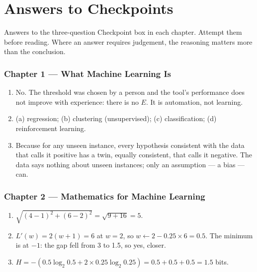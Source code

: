 \chapter{Answers to Checkpoints}\label{app:answers}
\normalfigures

Answers to the three-question Checkpoint box in each chapter. Attempt them before
reading. Where an answer requires judgement, the reasoning matters more than the
conclusion.

\newcommand{\ansch}[1]{\subsection*{\color{primary}Chapter #1}}
\newenvironment{ans}{\begin{enumerate}[leftmargin=*, itemsep=4pt, topsep=3pt,
  label=\textbf{\arabic*.}]}{\end{enumerate}}

\ansch{1 --- What Machine Learning Is}
\begin{ans}
  \item No. The threshold was chosen by a person and the tool's performance does not
        improve with experience: there is no $E$. It is automation, not learning.
  \item (a) regression; (b) clustering (unsupervised); (c) classification;
        (d) reinforcement learning.
  \item Because for any unseen instance, every hypothesis consistent with the data
        that calls it positive has a twin, equally consistent, that calls it negative.
        The data says nothing about unseen instances; only an assumption --- a bias
        --- can.
\end{ans}

\ansch{2 --- Mathematics for Machine Learning}
\begin{ans}
  \item $\sqrt{(4-1)^2 + (6-2)^2} = \sqrt{9 + 16} = 5$.
  \item $L'(w) = 2(w + 1) = 6$ at $w = 2$, so $w \leftarrow 2 - 0.25 \times 6 = 0.5$. The
        minimum is at $-1$: the gap fell from 3 to 1.5, so yes, closer.
  \item $H = -(0.5\log_2 0.5 + 2 \times 0.25\log_2 0.25) = 0.5 + 0.5 + 0.5 = 1.5$ bits.
\end{ans}


